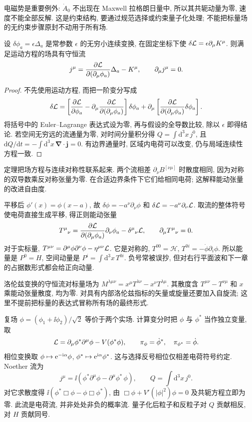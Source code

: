 电磁势是重要例外: $\dot A_0$ 不出现在 Maxwell 拉格朗日量中, 所以其共轭动量为零, 速度不能全部反解. 这是约束结构, 要通过规范选择或约束量子化处理; 不能把标量场的无约束步骤原封不动用于所有场.

\begin{proposition}\label{prop:noether-current}
设 $\delta\phi_a=\epsilon\Delta_a$ 是常参数 $\epsilon$ 的无穷小连续变换, 在固定坐标下使 $\delta\mathcal L=\epsilon\partial_\mu K^\mu$. 则满足运动方程的场具有守恒流
\[
j^\mu=\frac{\partial\mathcal L}{\partial(\partial_\mu\phi_a)}\Delta_a-K^\mu,\qquad \partial_\mu j^\mu=0.
\]
\end{proposition}
\begin{proof}
不先使用运动方程, 而把一阶变分写成
\[
\delta\mathcal L=\left[\frac{\partial\mathcal L}{\partial\phi_a}-\partial_\mu\frac{\partial\mathcal L}{\partial(\partial_\mu\phi_a)}\right]\delta\phi_a+
\partial_\mu\left[\frac{\partial\mathcal L}{\partial(\partial_\mu\phi_a)}\delta\phi_a\right].
\]
将括号中的 Euler--Lagrange 表达式设为零, 再与假设的全导数比较, 除以 $\epsilon$ 即得结论. 若空间无穷远的流通量为零, 对时间分量积分得 $Q=\int\mathrm d^3x\,j^0$, 且 $\mathrm dQ/\mathrm dt=-\int\mathrm d^3x\,\boldsymbol\nabla\cdot\mathbf j=0$. 有边界通量时, 区域内电荷可以改变, 仍与局域连续性方程一致.
\end{proof}
定理把场方程与连续对称性联系起来. 两个流相差 $\partial_\nu B^{[\nu\mu]}$ 时散度相同, 因为对称的双导数乘反对称张量为零. 在合适边界条件下它们给相同电荷; 这解释能动张量的改进自由度.

平移后 $\phi'(x)=\phi(x-a)$, 故 $\delta\phi=-a^\nu\partial_\nu\phi$ 和 $\delta\mathcal L=-a^\nu\partial_\nu\mathcal L$. 取流的整体符号使电荷直接生成平移, 得正则能动张量
\[
T^\mu{}_{\nu}=\frac{\partial\mathcal L}{\partial(\partial_\mu\phi_a)}\partial_\nu\phi_a-\delta^\mu{}_{\nu}\mathcal L,
\qquad \partial_\mu T^\mu{}_{\nu}=0.
\]
对于实标量, $T^{\mu\nu}=\partial^\mu\phi\partial^\nu\phi-\eta^{\mu\nu}\mathcal L$. 它是对称的, $T^{00}=\mathcal H$, $T^{0i}=-\dot\phi\partial_i\phi$. 所以能量是 $P^0=H$, 空间动量是 $P^i=\int\mathrm d^3x\,T^{0i}$. 负号常被误抄, 但对右行平面波和下一章的占据数形式都会给正向动量.

洛伦兹变换的守恒流对标量场为 $M^{\lambda\mu\nu}=x^\mu T^{\lambda\nu}-x^\nu T^{\lambda\mu}$. 其散度含 $T^{\mu\nu}-T^{\nu\mu}$ 和 $x$ 乘能动张量散度, 均为零. 对具有内部洛伦兹指标的矢量或旋量还要加入自旋流; 这里不提前把标量的表达式冒称所有场的最终形式.

复场 $\phi=(\phi_1+\ii\phi_2)/\sqrt2$ 等价于两个实场. 计算变分时把 $\phi$ 与 $\phi^*$ 当作独立变量, 取
\[
\mathcal L=\partial_\mu\phi^*\partial^\mu\phi-V(\phi^*\phi),\qquad
\pi_\phi=\dot\phi^*,\quad\pi_{\phi^*}=\dot\phi.
\]
相位变换取 $\phi\mapsto\mathrm e^{-\mathrm i\alpha}\phi$, $\phi^*\mapsto\mathrm e^{\mathrm i\alpha}\phi^*$. 这与选择反号相位仅相差电荷符号约定. Noether 流为
\[
j^\mu=\ii(\phi^*\partial^\mu\phi-\partial^\mu\phi^*\,\phi),\qquad
Q=\int\mathrm d^3x\,j^0.
\]
对它求散度得 $\ii(\phi^*\Box\phi-\phi\Box\phi^*)$, 由 $\Box\phi+V'(|\phi|^2)\phi=0$ 及共轭方程立即为零. 此流是电荷流, 并非处处非负的概率流. 量子化后粒子和反粒子对 $Q$ 贡献相反, 对 $H$ 贡献同号.

